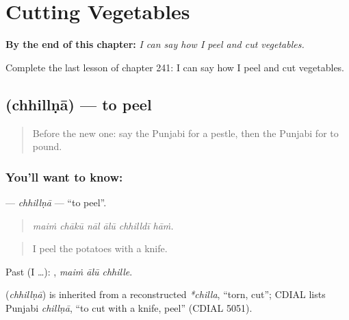 
\chapter{Cutting Vegetables}
\label{ch:pa-a2-cutting-vegetables}

\begin{chapteropening}
\textbf{By the end of this chapter:} \emph{I can say how I peel and cut vegetables.}

Complete the last lesson of chapter 241: I can say how I peel and cut vegetables.
\end{chapteropening}

\section[\texorpdfstring{\pa{ਛਿੱਲਣਾ} (chhillṇā)}{ਛਿੱਲਣਾ (chhillṇā)}]{ (chhillṇā) — to peel}

\label{lesson:PA-C241-chhillna}



\begin{quote}
Before the new one: say the Punjabi for a pestle, then the Punjabi for to pound.
\end{quote}

\subsection*{You'll want to know: }
\textbf{} — \emph{chhillṇā} — \textquotedblleft{}to peel\textquotedblright{}.

\begin{quote}
     
\end{quote}

\begin{quote}
\emph{maiṁ chākū nāl ālū chhilldī hāṁ.}
\end{quote}

\begin{quote}
I peel the potatoes with a knife.
\end{quote}

Past (I …):   , \emph{maiṁ ālū chhille}.

\begin{cousinweb}
\textbf{} (\emph{chhillṇā}) is inherited from a reconstructed \emph{*chilla}, \textquotedblleft{}torn, cut\textquotedblright{}; CDIAL lists Punjabi \emph{chillṇā}, \textquotedblleft{}to cut with a knife, peel\textquotedblright{} (CDIAL 5051).
\end{cousinweb}


